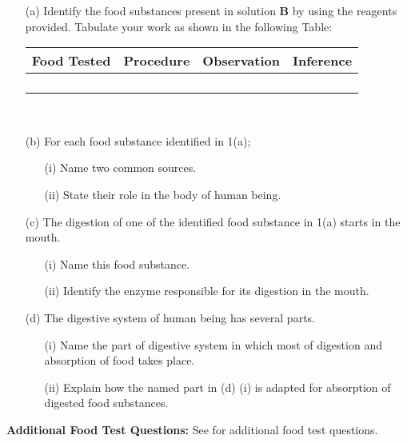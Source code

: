 \begin{enumerate}
\item[(a)] Identify the food substances present in solution \textbf{B} by using the reagents provided. Tabulate your work as shown in the following Table:

\begin{center}
\begin{tabular}{|p{3cm}|p{3cm}|p{3cm}|p{3cm}|} \hline
\multicolumn{1}{|c|}{\textbf{Food Tested}}&\multicolumn{1}{c|}{\textbf{Procedure}}&\multicolumn{1}{c|}{\textbf{Observation}}&\multicolumn{1}{c|}{\textbf{Inference}} \\ \hline
&&& \\
&&& \\
&&& \\
&&& \\ \hline
\end{tabular} \\[10pt]
\end{center}

\item[(b)] For each food substance identified in 1(a);
\begin{enumerate}
\item[(i)] Name two common sources.
\item[(ii)] State their role in the body of human being.
\end{enumerate}
\item[(c)] The digestion of one of the identified food substance in 1(a) starts in the mouth.
\begin{enumerate}
\item[(i)] Name this food substance.
\item[(ii)] Identify the enzyme responsible for its digestion in the mouth.
\end{enumerate}
\item[(d)] The digestive system of human being has several parts.
\begin{enumerate}
\item[(i)] Name the part of digestive system in which most of digestion and absorption of food takes place.
\item[(ii)] Explain how the named part in (d) (i) is adapted for absorption of digested food substances.
\end{enumerate}
\end{enumerate}

\textbf{Additional Food Test Questions:}
See  for additional food test questions.

